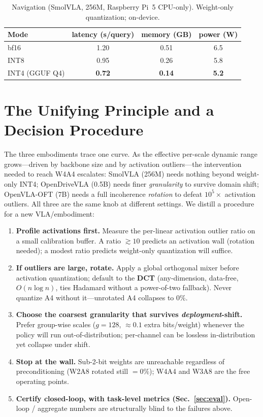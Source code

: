 \documentclass[11pt]{article}
\begin{document}
\begin{table}[h]\centering
\caption{Navigation (SmolVLA, 256M, Raspberry Pi~5 CPU-only). Weight-only quantization; on-device.}
\label{tab:nav}
\begin{tabular}{lccc}
\toprule
Mode & latency (s/query) & memory (GB) & power (W) \\
\midrule
bf16 & 1.20 & 0.51 & 6.5 \\
INT8 & 0.95 & 0.26 & 5.8 \\
INT4 (GGUF Q4) & \textbf{0.72} & \textbf{0.14} & \textbf{5.2} \\
\bottomrule
\end{tabular}
\end{table}

\section{The Unifying Principle and a Decision Procedure}\label{sec:rule}
The three embodiments trace one curve. As the effective per-scale dynamic range grows---driven by
backbone size and by activation outliers---the intervention needed to reach W4A4 escalates: SmolVLA
(256M) needs nothing beyond weight-only INT4; OpenDriveVLA (0.5B) needs finer \emph{granularity} to
survive domain shift; OpenVLA-OFT (7B) needs a full incoherence \emph{rotation} to defeat
$10^5\times$ activation outliers. All three are the same knob at different settings. We distill a
procedure for a new VLA/embodiment:
\begin{enumerate}
  \item \textbf{Profile activations first.} Measure the per-linear activation outlier ratio on a
        small calibration buffer. A ratio $\gtrsim 10$ predicts an activation wall (rotation needed);
        a modest ratio predicts weight-only quantization will suffice.
  \item \textbf{If outliers are large, rotate.} Apply a global orthogonal mixer before activation
        quantization; default to the \textbf{DCT} (any-dimension, data-free, $O(n\log n)$, ties
        Hadamard without a power-of-two fallback). Never quantize A4 without it---unrotated A4
        collapses to $0\%$.
  \item \textbf{Choose the coarsest granularity that survives \emph{deployment}-shift.} Prefer
        group-wise scales ($g{=}128$, $\approx0.1$ extra bits/weight) whenever the policy will run
        out-of-distribution; per-channel can be lossless in-distribution yet collapse under shift.
  \item \textbf{Stop at the wall.} Sub-2-bit weights are unreachable regardless of preconditioning
        (W2A8 rotated still $=0\%$); W4A4 and W3A8 are the free operating points.
  \item \textbf{Certify closed-loop, with task-level metrics (Sec.~\ref{sec:eval}).} Open-loop /
        aggregate numbers are structurally blind to the failures above.
\end{enumerate}
\end{document}
